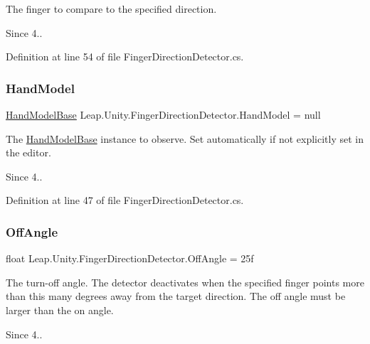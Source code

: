 The finger to compare to the specified direction. \begin{DoxySince}{Since}
4.. 
\end{DoxySince}


Definition at line 54 of file Finger\+Direction\+Detector.\+cs.

\mbox{\label{class_leap_1_1_unity_1_1_finger_direction_detector_a77aca25282ecbc1decc67ecf44a9561a}} 
\subsubsection{\texorpdfstring{HandModel}{HandModel}}
{\footnotesize\ttfamily \mbox{\hyperlink{class_leap_1_1_unity_1_1_hand_model_base}{Hand\+Model\+Base}} Leap.\+Unity.\+Finger\+Direction\+Detector.\+Hand\+Model = null}

The \mbox{\hyperlink{class_leap_1_1_unity_1_1_hand_model_base}{Hand\+Model\+Base}} instance to observe. Set automatically if not explicitly set in the editor. \begin{DoxySince}{Since}
4.. 
\end{DoxySince}


Definition at line 47 of file Finger\+Direction\+Detector.\+cs.

\mbox{\label{class_leap_1_1_unity_1_1_finger_direction_detector_a234c17e715950ba6810e2f3ae86a5d15}} 
\subsubsection{\texorpdfstring{OffAngle}{OffAngle}}
{\footnotesize\ttfamily float Leap.\+Unity.\+Finger\+Direction\+Detector.\+Off\+Angle = 25f}

The turn-\/off angle. The detector deactivates when the specified finger points more than this many degrees away from the target direction. The off angle must be larger than the on angle. \begin{DoxySince}{Since}
4.. 
\end{DoxySince}


